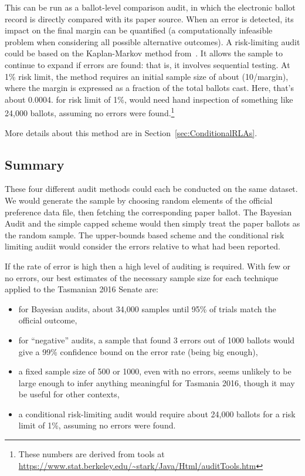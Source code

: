 \documentclass[10pt,a4paper]{article}
\newcommand{\shortVersion}[1]{}
\newcommand{\longVersion}[1]{#1}
\newcommand{\shortVersion}[1]{#1}
\newcommand{\longVersion}[1]{}
\begin{document}
This can be run as a ballot-level comparison audit, in which the electronic ballot record is directly compared with its paper source.  When an error is detected, its impact on the final margin can be quantified  (a computationally infeasible problem when considering all possible alternative outcomes).  
A risk-limiting audit could be based on the Kaplan-Markov  method from~\cite{stark2008conservative}.  It allows the sample to continue to expand if errors are found: that is, it involves sequential testing. 
At 1\% risk limit, the method requires an initial sample size of about (10/margin), where the margin is expressed as a fraction of the total ballots cast. Here, that's about 0.0004.
for risk limit of 1\%, would need hand inspection of something like 24,000 ballots, assuming no errors were found.\footnote{These numbers are derived from tools at {\url{https://www.stat.berkeley.edu/~stark/Java/Html/auditTools.htm}} } 

\shortVersion{}\longVersion{More details about this method are in Section~\ref{sec:ConditionalRLAs}.}

\subsection{Summary}
These four different audit methods could each be conducted on the same dataset.  We would generate the sample by choosing random elements of the official preference data file, then fetching the corresponding paper ballot.  The Bayesian Audit and the simple capped scheme would then simply treat the paper ballots as the random sample.  The upper-bounds based scheme and the conditional risk limiting audiit would consider the errors relative to what had been reported.

If the rate of error is high then a high level of auditing is required.  With few or no errors, our best estimates of the necessary sample size for each technique applied to the Tasmanian 2016 Senate are:
\begin{itemize}
	\item for Bayesian audits, about 34,000 samples until 95\% of trials match the official outcome,
	\item for ``negative'' audits, a sample that found 3 errors out of 1000 ballots would give a 99\% confidence bound on the error rate (being big enough),
	\item a fixed sample size of 500 or 1000, even with no errors, seems unlikely to be large enough to infer anything meaningful for Tasmania 2016, though it may be useful for other contexts,
	\item a conditional risk-limiting audit  would require about 24,000 ballots for a risk limit of 1\%, assuming no errors were found.
\end{itemize}
\end{document}
